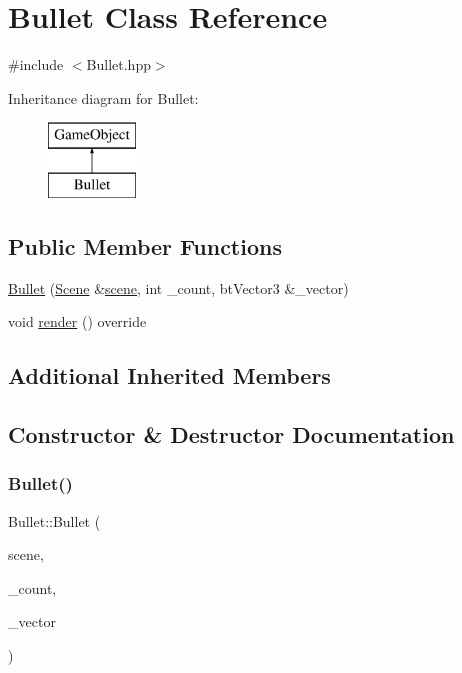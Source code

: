 \hypertarget{class_bullet}{}\section{Bullet Class Reference}
\label{class_bullet}


{\ttfamily \#include $<$Bullet.\+hpp$>$}

Inheritance diagram for Bullet\+:\begin{figure}[H]
\begin{center}
\leavevmode
\includegraphics[height=2.000000cm]{class_bullet}
\end{center}
\end{figure}
\subsection*{Public Member Functions}
\begin{DoxyCompactItemize}
\item 
\mbox{\hyperlink{class_bullet_a0e0e8391d068e29f566b4372f03af83a}{Bullet}} (\mbox{\hyperlink{class_scene}{Scene}} \&\mbox{\hyperlink{class_game_object_aeea61de934e13603696b4ed00e9fe42e}{scene}}, int \+\_\+count, bt\+Vector3 \&\+\_\+vector)
\item 
void \mbox{\hyperlink{class_bullet_a4b58c9ddf90ecd78b2e5b292c7496850}{render}} () override
\end{DoxyCompactItemize}
\subsection*{Additional Inherited Members}


\subsection{Constructor \& Destructor Documentation}
\mbox{\label{class_bullet_a0e0e8391d068e29f566b4372f03af83a}} 
\subsubsection{\texorpdfstring{Bullet()}{Bullet()}}
{\footnotesize\ttfamily Bullet\+::\+Bullet (\begin{DoxyParamCaption}\item[{\mbox{\hyperlink{class_scene}{Scene}} \&}]{scene,  }\item[{int}]{\+\_\+count,  }\item[{bt\+Vector3 \&}]{\+\_\+vector }\end{DoxyParamCaption})}



